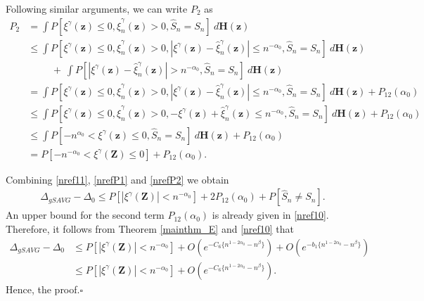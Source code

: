 \documentclass[twoside]{article}
\newcommand{\bZ}{\mathbf{Z}}
\newcommand{\bH}{\mathbf{H}}
\newcommand{\bz}{\mathbf{z}}
\newcommand{\0}{\mathbf{0}}
\newcommand{\1}{\mathbf{1}}
\newcommand*{\QEDB}{\hfill\ensuremath{\square}}
\numberwithin{equation}{section}
\begin{document}
Following similar arguments, we can write $P_2$ as 
\begin{align}\label{nrefP2}
    P_2 &= \int P[\xi^\gamma(\bz)\leq 0,\hat{\xi}^\gamma_{n}(\bz)> 0, \hat{S}_n=S_n]\ d\bH(\bz)\nonumber\\
    &\leq \int P[\xi^\gamma(\bz)\leq 0,\hat{\xi}^\gamma_{n}(\bz)> 0, |\xi^\gamma(\bz)-\hat{\xi}^\gamma_{n}(\bz)|\leq n^{-\alpha_0}, \hat{S}_n=S_n]\ d\bH(\bz)\nonumber\\
    &\hspace{1cm} +\ \int P[|\xi^\gamma(\bz)-\hat{\xi}^\gamma_{n}(\bz)|> n^{-\alpha_0}, \hat{S}_n=S_n]\ d\bH(\bz)\nonumber\\
    &= \int P[\xi^\gamma(\bz)\leq 0,\hat{\xi}^\gamma_{n}(\bz)> 0, |\xi^\gamma(\bz)-\hat{\xi}^\gamma_{n}(\bz)|\leq n^{-\alpha_0}, \hat{S}_n=S_n]\ d\bH(\bz) +P_{12}(\alpha_0)\nonumber\\
    &\leq \int P[\xi^\gamma(\bz)\leq 0,\hat{\xi}^\gamma_{n}(\bz)> 0, -\xi^\gamma(\bz)+\hat{\xi}^\gamma_{n}(\bz)\leq n^{-\alpha_0}, \hat{S}_n=S_n]\ d\bH(\bz) +P_{12}(\alpha_0)\nonumber\\
    &\leq \int P[-n^{\alpha_0}<\xi^\gamma(\bz)\leq 0, \hat{S}_n=S_n]\ d\bH(\bz) +P_{12}(\alpha_0)\nonumber\\
    &= P[-n^{-\alpha_0}<\xi^\gamma(\bZ)\leq 0] + P_{12}(\alpha_0).
\end{align}

Combining \eqref{nref11}, \eqref{nrefP1} and \eqref{nrefP2} we obtain
\begin{align*}
    \Delta_{gSAVG} - \Delta_0\leq P[|\xi^\gamma(\bZ)|< n^{-\alpha_0}] + 2P_{12}(\alpha_0) + P[\hat{S}_n\neq S_n].
\end{align*}
An upper bound for the second term $P_{12}(\alpha_0)$ is already given in \eqref{nref10}. Therefore, it follows from Theorem \ref{mainthm_E} and \eqref{nref10} that 
\begin{align*}
    \Delta_{gSAVG} - \Delta_0 &\leq P[|\xi^\gamma(\bZ)|< n^{-\alpha_0}] + O(e^{-C_6\{ n^{1-2\alpha_0}- n^\beta\}}) + O(e^{-b_1\{ n^{1-2\alpha_0}- n^\beta\}})\\
    &\leq P[|\xi^\gamma(\bZ)|< n^{-\alpha_0}] + O(e^{-C_6\{ n^{1-2\alpha_0}- n^\beta\}}).
\end{align*}
Hence, the proof.\hspace*{\fill}\QEDB\newline
\end{document}
